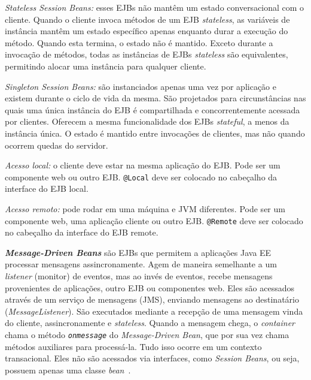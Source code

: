 \textit{Stateless Session Beans:} esses EJBs não mantêm um estado conversacional com o cliente. Quando o cliente invoca métodos de um EJB \textit{stateless}, as variáveis de instância mantêm um estado específico apenas enquanto durar a execução do método. Quando esta termina, o estado não é mantido. Exceto durante a invocação de métodos, todas as instâncias de EJBs \textit{stateless} são equivalentes, permitindo alocar uma instância para qualquer cliente. 

\textit{Singleton Session Beans:} são instanciados apenas uma vez por aplicação e existem durante o ciclo de vida da mesma. São projetados para circunstâncias nas quais uma única instância do EJB é compartilhada e concorrentemente acessada por clientes. Oferecem a mesma funcionalidade dos EJBs \textit{stateful}, a menos da instância única. O estado é mantido entre invocações de clientes, mas não quando ocorrem quedas do servidor. 

\textit{Acesso local:} o cliente deve estar na mesma aplicação do EJB. Pode ser um componente web ou outro EJB. \texttt{@Local} deve ser colocado no cabeçalho da interface do EJB local.

\textit{Acesso remoto:} pode rodar em uma máquina e JVM diferentes. Pode ser um componente web, uma aplicação cliente ou outro EJB. \texttt{@Remote} deve ser colocado no cabeçalho da interface do EJB remote.

\textbf{\textit{Message-Driven Beans}} são EJBs que permitem a aplicações Java EE processar mensagens assincronamente. Agem de maneira semelhante a um \textit{listener} (monitor) de eventos, mas ao invés de eventos, recebe mensagens provenientes de aplicações, outro EJB ou componentes web. Eles são acessados através de um serviço de mensagens (JMS), enviando mensagens ao destinatário (\textit{MessageListener}). São executados mediante a recepção de uma mensagem vinda do cliente, assincronamente e \textit{stateless}. Quando a mensagem chega, o \textit{container} chama o método \texttt{\textit{onmessage}} do \textit{Message-Driven Bean}, que por sua vez chama métodos auxiliares para processá-la. Tudo isso ocorre em um contexto transacional. Eles não são acessados via interfaces, como \textit{Session Beans}, ou seja, possuem apenas uma classe \textit{bean}~\cite{PasteurEJB}. 





